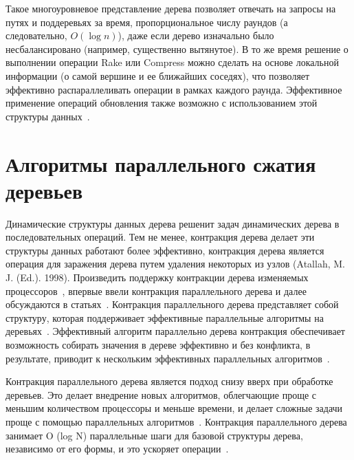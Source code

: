 \documentclass[specification,annotation]{itmo-student-thesis}
\newcommand{\revise}[1]{{\color{red!70!black} #1 }}
\begin{document}
Такое многоуровневое представление дерева позволяет отвечать на запросы на путях и поддеревьях за время, пропорциональное числу раундов (а следовательно, $O(\log n)$),
даже если дерево изначально было несбалансировано (например, существенно вытянутое). В то же время решение о выполнении операции Rake или Compress можно сделать на основе локальной информации (о самой
вершине и ее ближайших соседях), что позволяет эффективно распараллеливать операции в рамках каждого раунда.
Эффективное применение операций обновления также возможно с использованием этой структуры данных~\cite{acar04}.

\section{Алгоритмы параллельного сжатия деревьев}\label{survey-contraction}

\revise{
Динамические структуры данных дерева решенит задач динамических дерева в последовательных операций. Тем не менее, контракция дерева делает эти структуры данных работают более эффективно, контракция дерева 
является операция для заражения дерева путем удаления некоторых из узлов (Atallah, M. J. (Ed.). 1998). Произведить поддержку контракции дерева изменяемых процессоров~\cite{miller85, miller89},
впервые ввели контракция параллельного дерева и далее обсуждаются в статьях~\cite{miller91, reif94}. Контракция параллельного дерева представляет собой 
структуру, которая поддерживает эффективные параллельные алгоритмы на деревьях~\cite{morihata08}. Эффективный алгоритм параллельно дерева контракция обеспечивает возможность собирать 
значения в дереве эффективно и без конфликта, в результате, приводит к нескольким эффективных параллельных алгоритмов~\cite{morihata11}.
}

\revise{
Контракция параллельного дерева является подход снизу вверх при обработке деревьев. Это делает внедрение новых алгоритмов, облегчающие проще с меньшим количеством процессоры и меньше времени, и делает 
сложные задачи проще с помощью параллельных алгоритмов~\cite{miller85}. Контракция параллельного дерева занимает O (log N) параллельные шаги для базовой структуры дерева, независимо от его 
формы, и это ускоряет операции~\cite{morihata14}.
}
\end{document}
